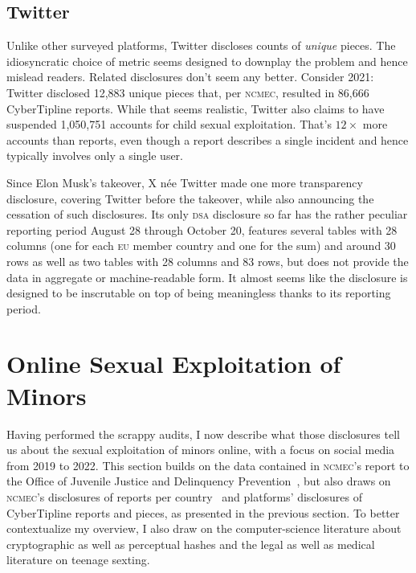 \documentclass[nonacm,screen]{acmart}
\newcommand\V[1]{\textsc{\MakeLowercase{#1}}}
\begin{document}
\subsection{Twitter}

Unlike other surveyed platforms, Twitter discloses counts of \emph{unique}
pieces. The idiosyncratic choice of metric seems designed to downplay the
problem and hence mislead readers. Related disclosures don't seem any better.
Consider 2021: Twitter disclosed 12,883 unique pieces that, per \V{NCMEC},
resulted in 86,666 CyberTipline reports. While that seems realistic, Twitter
also claims to have suspended 1,050,751 accounts for child sexual exploitation.
That's $12\times$ more accounts than reports, even though a report describes a
single incident and hence typically involves only a single user.

Since Elon Musk's takeover, X née Twitter made one more transparency disclosure,
covering Twitter before the takeover, while also announcing the cessation of
such disclosures. Its only \V{DSA} disclosure so far has the rather peculiar
reporting period August 28 through October 20, features several tables with 28
columns (one for each \V{EU} member country and one for the sum) and around 30
rows as well as two tables with 28 columns and 83 rows, but does not provide the
data in aggregate or machine-readable form. It almost seems like the disclosure
is designed to be inscrutable on top of being meaningless thanks to its
reporting period.



\section{Online Sexual Exploitation of Minors}
\label{sec:global-spread}

Having performed the scrappy audits, I now describe what those disclosures tell
us about the sexual exploitation of minors online, with a focus on social media
from 2019 to 2022. This section builds on the data contained in \V{NCMEC}'s
report to the Office of Juvenile Justice and Delinquency
Prevention~\cite{NCMEC2023}, but also draws on \V{NCMEC}'s disclosures of
reports per country~\cite{NcmecByCountry2019,NcmecByCountry2020,
NcmecByCountry2021,NcmecByCountry2022} and platforms' disclosures of
CyberTipline reports and pieces, as presented in the previous section. To better
contextualize my overview, I also draw on the computer-science literature about
cryptographic as well as perceptual hashes and the legal as well as medical
literature on teenage sexting.
\end{document}
